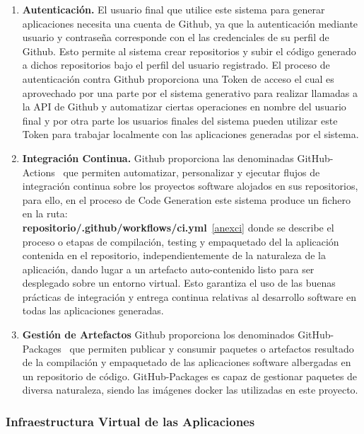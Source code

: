 \documentclass[a4paper,11pt]{book}
\begin{document}
\begin{enumerate}
\item \textbf{ Autenticación.} El usuario final que utilice este sistema para generar aplicaciones necesita una cuenta de Github, ya que la autenticación mediante usuario y contraseña corresponde con el las credenciales  de su perfil de Github. Esto permite al sistema crear repositorios y subir el código generado a dichos repositorios bajo el perfil del usuario registrado. El proceso de autenticación contra Github proporciona una Token  de acceso el cual es aprovechado por una parte por el sistema generativo para realizar llamadas a la API  de Github y automatizar ciertas operaciones en nombre del usuario final y por otra parte los usuarios finales del sistema  pueden utilizar este Token para trabajar localmente con las aplicaciones generadas por el sistema.

\item   \textbf{Integración Continua.} Github proporciona las denominadas GitHub-Actions~\cite{github3}  que permiten automatizar, personalizar y ejecutar flujos de integración continua  sobre los proyectos software alojados en sus repositorios, para ello, en el proceso de Code Generation este sistema produce un fichero  en la ruta:\\
\textbf{repositorio/.github/workflows/ci.yml}~\ref{anexci} donde se describe el proceso o etapas de compilación, testing y empaquetado del la aplicación contenida en el repositorio, independientemente de la naturaleza de la aplicación, dando lugar a un artefacto auto-contenido listo para ser desplegado sobre un entorno virtual. Esto garantiza el uso de las buenas prácticas  de integración y entrega continua relativas al desarrollo software en todas las aplicaciones generadas.

\item \textbf{Gestión de Artefactos} Github proporciona los denominados GitHub-Packages~\cite{github4} que permiten publicar y consumir paquetes o artefactos resultado de la compilación y empaquetado de las aplicaciones software albergadas en un repositorio de código. GitHub-Packages es capaz de gestionar paquetes de diversa naturaleza, siendo las imágenes docker las utilizadas en este proyecto.
\end{enumerate}

\subsubsection{Infraestructura Virtual de las Aplicaciones}\label{infra}
\end{document}
